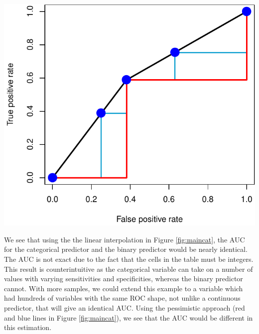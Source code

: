 \documentclass[article]{jss}
\let\origfigure\figure
\let\endorigfigure\endfigure
\renewenvironment{figure}[1][2] {
    \expandafter\origfigure\expandafter[H]
} {
    \endorigfigure
}
\begin{document}
\begin{CodeChunk}
\begin{figure}[H]

{\centering \includegraphics{index_revision_files/figure-latex/maincat-1} 

}

\caption[ROC curve of a 4-level categorical variable compared to the binary predictor]{ROC curve of a 4-level categorical variable compared to the binary predictor. Here we present the ROC curve of a categorical predictor (blue points) compared to that of the binary predictor (black line).  We see that the ROC curve is identical if the linear inerpolation is used (accounting for ties).  The red and blue lines show the ROC of the binary and categorical predictor, respectively, using the pessimistic approach.  We believe this demonstrates that although there is more gradation in the categorical variable, using the standard approach provides the same AUC, though we believe these variables have different levels of information as the binary predictor cannot obtain values other than the 2 categories.  }\label{fig:maincat}
\end{figure}
\end{CodeChunk}

We see that using the the linear interpolation in Figure
\ref{fig:maincat}, the AUC for the categorical predictor and the binary
predictor would be nearly identical. The AUC is not exact due to the
fact that the cells in the table must be integers. This result is
counterintuitive as the categorical variable can take on a number of
values with varying sensitivities and specificities, whereas the binary
predictor cannot. With more samples, we could extend this example to a
variable which had hundreds of variables with the same ROC shape, not
unlike a continuous predictor, that will give an identical AUC. Using
the pessimistic approach (red and blue lines in Figure
\ref{fig:maincat}), we see that the AUC would be different in this
estimation.
\end{document}
